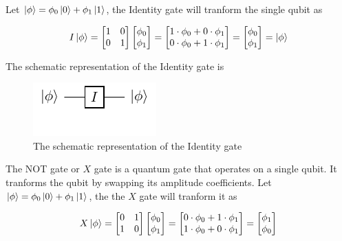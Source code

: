 Let $\ket{\phi} = \phi_0\ket{0} + \phi_1\ket{1}$, the Identity gate will tranform the
single qubit as

\begin{equation}
    I\ket{\phi}=\begin{bmatrix}
        1 & 0\\
        0 & 1
    \end{bmatrix}
    \begin{bmatrix}
        \phi_0\\
        \phi_1
    \end{bmatrix}
    =
    \begin{bmatrix}
        1\cdot\phi_0 + 0\cdot\phi_1\\
        0\cdot\phi_0 + 1\cdot\phi_1
    \end{bmatrix}
    =
    \begin{bmatrix}
        \phi_0\\
        \phi_1
    \end{bmatrix}
    = \ket{\phi}
\end{equation}

The schematic representation of the Identity gate is

\begin{figure}[ht]
    \centering
    \includegraphics{images/3_Quantum_Computing/identity_gate.pdf}
    \caption{The schematic representation of the Identity gate}
\end{figure}

The NOT gate or $X$ gate is a quantum gate that operates on a single qubit. It tranforms
the qubit by swapping its amplitude coefficients. Let $\ket{\phi} = \phi_0\ket{0} + \phi_1\ket{1}$,
the the $X$ gate will tranform it as

\begin{equation}
    X\ket{\phi}=\begin{bmatrix}
        0 & 1\\
        1 & 0
    \end{bmatrix}
    \begin{bmatrix}
        \phi_0\\
        \phi_1
    \end{bmatrix}
    =
    \begin{bmatrix}
        0\cdot\phi_0 + 1\cdot\phi_1\\
        1\cdot\phi_0 + 0\cdot\phi_1
    \end{bmatrix}
    =
    \begin{bmatrix}
        \phi_1\\
        \phi_0
    \end{bmatrix}
\end{equation}

